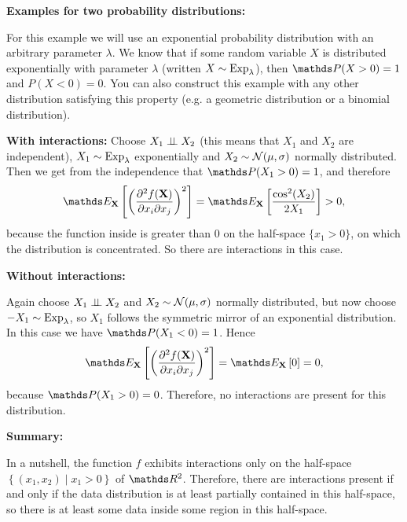 {\textbf{Examples for two probability distributions:}

For this example we will use an exponential probability distribution with an arbitrary parameter \(\lambda\).
We know that if some random variable \(X\) is distributed exponentially with parameter $\lambda$ (written $X \overset{}{\sim} \operatorname{\mathrm{Exp}}_\lambda$), then \( \P(X>0) = 1 \) and \( P(X<0) = 0 \). You can also construct this example with any other distribution satisfying this property (e.g. a geometric distribution or a binomial distribution).

\textbf{With interactions:}
Choose \(X_1 \perp \!\!\! \perp X_2\) (this means that $X_1$ and $X_2$ are independent), $X_1 \overset{}{\sim} \operatorname{\mathrm{Exp}}_\lambda$ exponentially and $X_2 \overset{}{\sim} \mathcal{N}(\mu, \sigma)$ normally distributed.
Then we get from the independence that \( \P (X_1 > 0) = 1 \), and therefore
$$
\E_\Xv \left[ \left( \frac{\partial^2 f(\Xv)}{\partial x_i \partial x_j} \right)^2 \right]
= \E_\Xv \left[ \frac{\cos^2(X_2)}{2 X_1} \right] > 0,
$$
because the function inside is greater than 0 on the half-space \(\{ x_1 > 0 \}\), on which the distribution is concentrated.
So there are interactions in this case.

\textbf{Without interactions:}

Again choose \(X_1 \perp \!\!\! \perp X_2\) and $X_2 \overset{}{\sim} \mathcal{N}(\mu, \sigma)$ normally distributed, but now choose $ -X_1 \overset{}{\sim} \operatorname{\mathrm{Exp}}_\lambda$, so $X_1$ follows the symmetric mirror of an exponential distribution.
In this case we have \( \P (X_1 < 0) = 1 \).
Hence
$$
\E_\Xv \left[ \left( \frac{\partial^2 f(\Xv)}{\partial x_i \partial x_j} \right)^2 \right]
= \E_\Xv \left[ 0 \right] = 0,
$$
because \( \P (X_1 > 0) = 0 \).
Therefore, no interactions are present for this distribution.

\textbf{Summary:}

In a nutshell, the function \(f\) exhibits interactions only on the half-space \( \left\{ (x_1,x_2) \middle| x_1 > 0 \right\} \) of \(\R^2\).
Therefore, there are interactions present if and only if the data distribution is at least partially contained in this half-space, so there is at least some data inside some region in this half-space.


}
